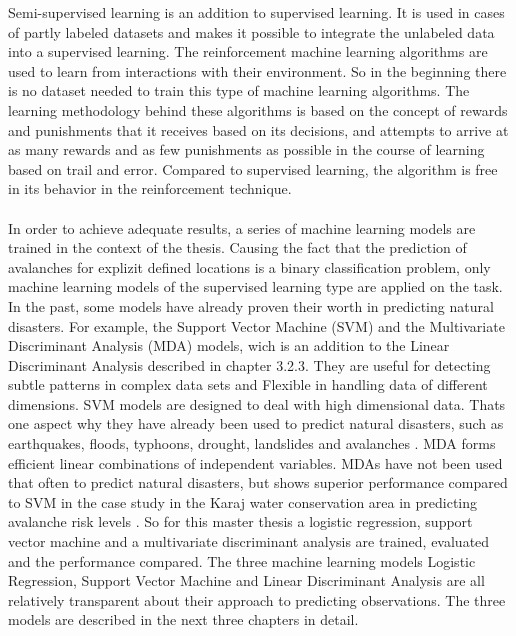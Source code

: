 \documentclass[../masterarbeit.tex]{subfiles}
\begin{document}
Semi-supervised learning is an addition to supervised learning. It is used in cases of partly labeled datasets and makes it possible to integrate the unlabeled data into a supervised learning. \autocite[]{ibm-supervised-learning:2022}\autocite[]{VIEIRA20201}
The reinforcement machine learning algorithms are used to learn from interactions with their environment. So in the beginning there is no dataset needed to train this type of machine learning algorithms. The learning methodology behind these algorithms is based on the concept of rewards and punishments that it receives based on its decisions, and attempts to arrive at as many rewards and as few punishments as possible in the course of learning based on trail and error. Compared to supervised learning, the algorithm is free in its behavior in the reinforcement technique. \autocite[]{ionos-reinforcement-learning:2022} \autocite[]{VIEIRA20201} \\~\\
In order to achieve adequate results, a series of machine learning models are trained in the context of the thesis. Causing the fact that the prediction of avalanches for explizit defined locations is a binary classification problem, only machine learning models of the supervised learning type are applied on the task.\\
In the past, some models have already proven their worth in predicting natural disasters. For example, the Support Vector Machine (SVM) and the Multivariate Discriminant Analysis (MDA) models, wich is an addition to the Linear Discriminant Analysis described in chapter 3.2.3. They are useful for detecting subtle patterns in complex data sets and Flexible in handling data of different dimensions. SVM models are designed to deal with high dimensional data. Thats one aspect why they have already been used to predict natural disasters, such as earthquakes, floods, typhoons, drought, landslides and avalanches \textcite[]{Bahram:2019} \textcite[]{Tiwari:2021} \textcite[]{Pozdnoukhov:2008}. MDA forms efficient linear combinations of independent variables. MDAs have not been used that often to predict natural disasters, but shows superior performance compared to SVM in the case study in the Karaj water conservation area in predicting avalanche risk levels \textcite[]{Bahram:2019}. So for this master thesis a logistic regression, support vector machine and a multivariate discriminant analysis are trained, evaluated and the performance compared. The three machine learning models Logistic Regression, Support Vector Machine and Linear Discriminant Analysis are all relatively transparent about their approach to predicting observations. The three models are described in the next three chapters in detail.
\end{document}
